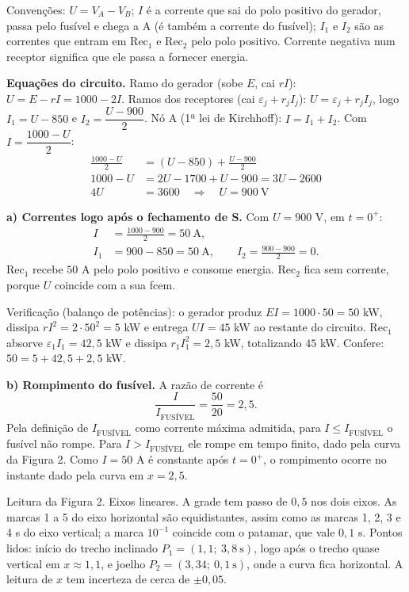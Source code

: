 \documentclass{article}%
\begin{document}
Convenções: $U = V_A - V_B$; $I$ é a corrente que sai do polo positivo do gerador, passa pelo fusível e chega a A (é também a corrente do fusível); $I_1$ e $I_2$ são as correntes que entram em Rec$_1$ e Rec$_2$ pelo polo positivo. Corrente negativa num receptor significa que ele passa a fornecer energia.

\textbf{Equações do circuito.}
Ramo do gerador (sobe $E$, cai $rI$): $U = E - rI = 1000 - 2I$.
Ramos dos receptores (cai $\varepsilon_j + r_j I_j$): $U = \varepsilon_j + r_j I_j$, logo $I_1 = U - 850$ e $I_2 = \dfrac{U - 900}{2}$.
Nó A (1ª lei de Kirchhoff): $I = I_1 + I_2$. Com $I = \dfrac{1000 - U}{2}$:
\begin{align*}
\frac{1000 - U}{2} &= (U - 850) + \frac{U - 900}{2} \\
1000 - U &= 2U - 1700 + U - 900 = 3U - 2600 \\
4U &= 3600 \quad\Rightarrow\quad U = 900\ \text{V}
\end{align*}

\textbf{a) Correntes logo após o fechamento de S.} Com $U = 900$ V, em $t = 0^+$:
\begin{align*}
I &= \frac{1000 - 900}{2} = 50\ \text{A}, \\
I_1 &= 900 - 850 = 50\ \text{A}, \qquad I_2 = \frac{900 - 900}{2} = 0.
\end{align*}
Rec$_1$ recebe $50$ A pelo polo positivo e consome energia. Rec$_2$ fica sem corrente, porque $U$ coincide com a sua fcem.

Verificação (balanço de potências): o gerador produz $EI = 1000 \cdot 50 = 50$ kW, dissipa $rI^2 = 2 \cdot 50^2 = 5$ kW e entrega $UI = 45$ kW ao restante do circuito. Rec$_1$ absorve $\varepsilon_1 I_1 = 42{,}5$ kW e dissipa $r_1 I_1^2 = 2{,}5$ kW, totalizando $45$ kW. Confere: $50 = 5 + 42{,}5 + 2{,}5$ kW.

\textbf{b) Rompimento do fusível.} A razão de corrente é
\[ \frac{I}{I_{\text{FUSÍVEL}}} = \frac{50}{20} = 2{,}5. \]
Pela definição de $I_{\text{FUSÍVEL}}$ como corrente máxima admitida, para $I \le I_{\text{FUSÍVEL}}$ o fusível não rompe. Para $I > I_{\text{FUSÍVEL}}$ ele rompe em tempo finito, dado pela curva da Figura 2. Como $I = 50$ A é constante após $t = 0^+$, o rompimento ocorre no instante dado pela curva em $x = 2{,}5$.

Leitura da Figura 2. Eixos lineares. A grade tem passo de $0{,}5$ nos dois eixos. As marcas 1 a 5 do eixo horizontal são equidistantes, assim como as marcas 1, 2, 3 e 4 s do eixo vertical; a marca $10^{-1}$ coincide com o patamar, que vale $0{,}1$ s. Pontos lidos: início do trecho inclinado $P_1 = (1{,}1;\ 3{,}8\ \text{s})$, logo após o trecho quase vertical em $x \approx 1{,}1$, e joelho $P_2 = (3{,}34;\ 0{,}1\ \text{s})$, onde a curva fica horizontal. A leitura de $x$ tem incerteza de cerca de $\pm 0{,}05$.
\end{document}
